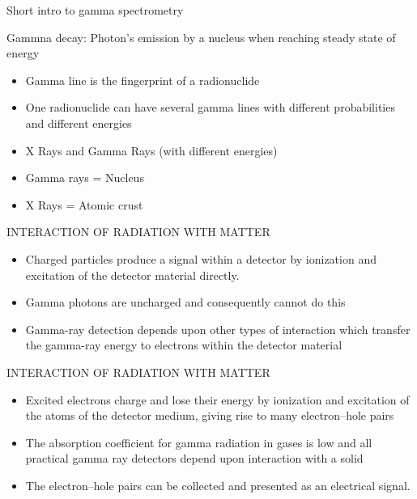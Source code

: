 \begin{frame}[allowframebreaks]{Short intro to gamma spectrometry}


\begin{exampleblock}{Gammna decay: Photon’s emission by a nucleus when reaching steady state of energy}

\begin{itemize}
	\item Gamma line is the fingerprint of a radionuclide 
	\item One radionuclide can have several gamma lines with different probabilities and different energies 
	\item X Rays and Gamma Rays (with different energies) 
	\item Gamma rays = Nucleus 
	\item X Rays = Atomic crust
\end{itemize}

\end{exampleblock}


\begin{exampleblock}{INTERACTION OF RADIATION WITH MATTER}


\begin{itemize}
\item Charged particles produce a signal within a detector by ionization and excitation of the detector material directly. 
\item Gamma photons are uncharged and consequently cannot do this 
\item Gamma-ray detection depends upon other types of interaction which transfer the gamma-ray energy to electrons within the detector material 
\end{itemize}

\end{exampleblock}

\begin{exampleblock}{INTERACTION OF RADIATION WITH MATTER}


\begin{itemize}
\item Excited electrons charge and lose their energy by ionization and excitation of the atoms of the detector medium, giving rise to many electron–hole pairs 
\item The absorption coefficient for gamma radiation in gases is low and all practical gamma ray detectors depend upon interaction with a solid 
\item The electron–hole pairs can be collected and presented as an electrical signal.
\end{itemize}

\end{exampleblock}

\end{frame}

